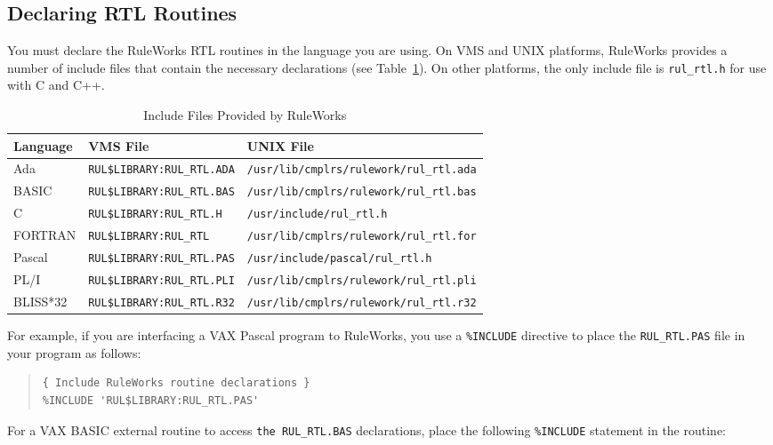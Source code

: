\subsection{Declaring RTL Routines}

You must declare the RuleWorks RTL routines in the language you are
using. On VMS and UNIX platforms, RuleWorks provides a number of
include files that contain the necessary declarations (see
Table~\ref{t:6-4}). On other platforms, the only include file is
\verb|rul_rtl.h| for use with C and C++.

\begin{table}[h]
  \begin{tabularx}{\columnwidth}{lll}
    \toprule
    Language & VMS File & UNIX File \\
    \midrule
    Ada      & \verb|RUL$LIBRARY:RUL_RTL.ADA| & \verb|/usr/lib/cmplrs/rulework/rul_rtl.ada| \\
    BASIC    & \verb|RUL$LIBRARY:RUL_RTL.BAS| & \verb|/usr/lib/cmplrs/rulework/rul_rtl.bas| \\
    C        & \verb|RUL$LIBRARY:RUL_RTL.H|   & \verb|/usr/include/rul_rtl.h|               \\   
    FORTRAN  & \verb|RUL$LIBRARY:RUL_RTL|     & \verb|/usr/lib/cmplrs/rulework/rul_rtl.for| \\
    Pascal   & \verb|RUL$LIBRARY:RUL_RTL.PAS| & \verb|/usr/include/pascal/rul_rtl.h|        \\
    PL/I     & \verb|RUL$LIBRARY:RUL_RTL.PLI| & \verb|/usr/lib/cmplrs/rulework/rul_rtl.pli| \\
    BLISS*32 & \verb|RUL$LIBRARY:RUL_RTL.R32| & \verb|/usr/lib/cmplrs/rulework/rul_rtl.r32| \\
  \end{tabularx}
  \caption{Include Files Provided by RuleWorks}
  \label{t:6-4}
\end{table}

For example, if you are interfacing a VAX Pascal program to RuleWorks,
you use a \verb|%INCLUDE| directive to place the \verb|RUL_RTL.PAS|
file in your program as follows:

\begin{quote}
\begin{verbatim}
{ Include RuleWorks routine declarations }
%INCLUDE 'RUL$LIBRARY:RUL_RTL.PAS'
\end{verbatim}
\end{quote}

For a VAX BASIC external routine to access \verb|the RUL_RTL.BAS|
declarations, place the following \verb|%INCLUDE| statement in the
routine:

